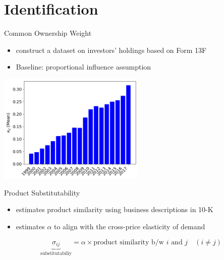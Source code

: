 \documentclass[
  aspectratio=169,  %
]{beamer}
\theoremstyle{plain}
\begin{document}
\section{Identification}

\begin{frame}{Common Ownership Weight}
  \begin{itemize}
    \item \citet{Backus2021-yt} construct a dataset on investors' holdings
          based on Form 13F
    \item Baseline: \cite{Rotemberg1984-jz} proportional influence assumption \hfill\hyperlink{rotemberg}{}
  \end{itemize}
  \begin{center}
    \includegraphics[width=7cm]{figures/kappa}
  \end{center}
\end{frame}
%
\begin{frame}{Product Substitutability}

  \begin{itemize}
    \item \citet{Hoberg2016-jm} estimates product similarity using business
          descriptions in 10-K
          \medskip{}
    \item \citet{Pellegrino2024-dn} estimates $\alpha$ to align with the cross-price
          elasticity of demand
  \end{itemize}
  \medskip{}
  \[
    \underbrace{\sigma_{ij}}_{\text{substitutabiliy}}=\alpha\times\text{product similarity b/w }i\text{ and }j\quad\left(i\neq j\right)
  \]

\end{frame}
%
\end{document}
